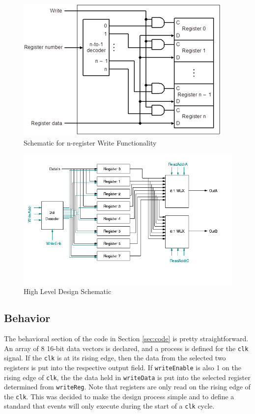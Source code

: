 \documentclass[12pt]{article}
\begin{document}
\begin{figure}[H]
\centering
\includegraphics[width=0.8\linewidth]{write}
\caption{Schematic for n-register Write Functionality}
\label{fig:write}
\end{figure}

\begin{figure}[H]
\centering
\includegraphics[width=\linewidth]{register_file}
\caption{High Level Design Schematic}
\label{fig:register_file}
\end{figure}

\subsection{Behavior}
The behavioral section of the code in Section \ref{sec:code} is pretty straightforward. An array of 8 16-bit data vectors is declared, and a process is defined for the \texttt{clk} signal. If the \texttt{clk} is at its rising edge, then the data from the selected two registers is put into the respective output field. If \texttt{writeEnable} is also 1 on the rising edge of \texttt{clk}, the the data held in \texttt{writeData} is put into the selected register determined from \texttt{writeReg}. Note that registers are only read on the rising edge of the \texttt{clk}. This was decided to make the design process simple and to define a standard that events will only execute during the start of a \texttt{clk} cycle.
\end{document}
